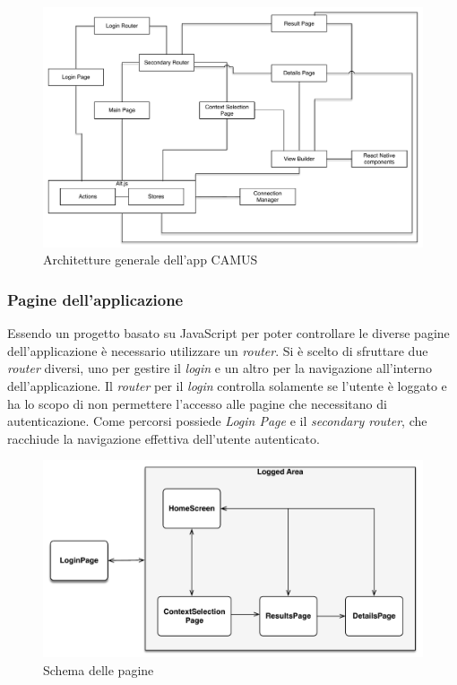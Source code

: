 \begin{figure}[h]
	\centering
	\includegraphics[width=\textwidth]{4-progettazione-alto-livello/Immagini/app_architecture.pdf}
	\caption{Architetture generale dell'app CAMUS}\label{fig:app-architecture}
\end{figure}

\subsubsection{Pagine dell'applicazione}

Essendo un progetto basato su JavaScript per poter controllare le diverse pagine dell'applicazione è necessario utilizzare un \emph{router}. Si è scelto di sfruttare due \emph{router} diversi, uno per gestire il \emph{login} e un altro per la navigazione all'interno dell'applicazione. Il \emph{router} per il \emph{login} controlla solamente se l'utente è loggato e ha lo scopo di non permettere l'accesso alle pagine che necessitano di autenticazione. Come percorsi possiede \emph{Login Page} e il \emph{secondary router}, che racchiude la navigazione effettiva dell'utente autenticato.

\begin{figure}[H]
	\centering
	\includegraphics[width=\textwidth]{4-progettazione-alto-livello/Immagini/screen_schema.pdf}
	\caption{Schema delle pagine}\label{fig:screen-schema}
\end{figure}

